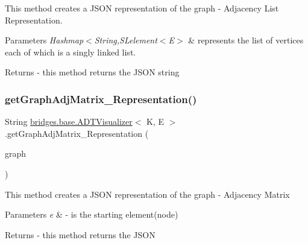 This method creates a J\+S\+ON representation of the graph -\/ Adjacency List Representation. 
\begin{DoxyParams}{Parameters}
{\em Hashmap$<$\+String,S\+Lelement$<$\+E$>$} & represents the list of vertices each of which is a singly linked list. \\
\hline
\end{DoxyParams}
\begin{DoxyReturn}{Returns}
-\/ this method returns the J\+S\+ON string 
\end{DoxyReturn}
\hypertarget{classbridges_1_1base_1_1_a_d_t_visualizer_a7e3ecfc9522596bd12f0adef694eacf2}{}\label{classbridges_1_1base_1_1_a_d_t_visualizer_a7e3ecfc9522596bd12f0adef694eacf2} 
\subsubsection{\texorpdfstring{get\+Graph\+Adj\+Matrix\+\_\+\+Representation()}{getGraphAdjMatrix\_Representation()}}
{\footnotesize\ttfamily String \hyperlink{classbridges_1_1base_1_1_a_d_t_visualizer}{bridges.\+base.\+A\+D\+T\+Visualizer}$<$ K, E $>$.get\+Graph\+Adj\+Matrix\+\_\+\+Representation (\begin{DoxyParamCaption}\item[{\hyperlink{classbridges_1_1base_1_1_graph_adj_matrix}{Graph\+Adj\+Matrix}$<$ K, E $>$}]{graph }\end{DoxyParamCaption})}

This method creates a J\+S\+ON representation of the graph -\/ Adjacency Matrix


\begin{DoxyParams}{Parameters}
{\em e} & -\/ is the starting element(node) \\
\hline
\end{DoxyParams}
\begin{DoxyReturn}{Returns}
-\/ this method returns the J\+S\+ON 
\end{DoxyReturn}
\hypertarget{classbridges_1_1base_1_1_a_d_t_visualizer_a8bfd44ca6eef7b19feb6061cb7e141ef}{}\label{classbridges_1_1base_1_1_a_d_t_visualizer_a8bfd44ca6eef7b19feb6061cb7e141ef} 
